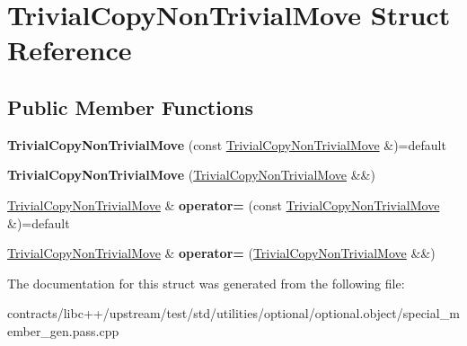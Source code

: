 \hypertarget{struct_trivial_copy_non_trivial_move}{}\section{Trivial\+Copy\+Non\+Trivial\+Move Struct Reference}
\label{struct_trivial_copy_non_trivial_move}
\subsection*{Public Member Functions}
\begin{DoxyCompactItemize}
\item 
\mbox{\label{struct_trivial_copy_non_trivial_move_a9db16c03ff7e561976174f022e8b96e0}} 
{\bfseries Trivial\+Copy\+Non\+Trivial\+Move} (const \mbox{\hyperlink{struct_trivial_copy_non_trivial_move}{Trivial\+Copy\+Non\+Trivial\+Move}} \&)=default
\item 
\mbox{\label{struct_trivial_copy_non_trivial_move_a5a4061f7f4d8db950cba2d0ec3b11548}} 
{\bfseries Trivial\+Copy\+Non\+Trivial\+Move} (\mbox{\hyperlink{struct_trivial_copy_non_trivial_move}{Trivial\+Copy\+Non\+Trivial\+Move}} \&\&)
\item 
\mbox{\label{struct_trivial_copy_non_trivial_move_a4f0f6c2f1333d71b950bfa76efe0ac65}} 
\mbox{\hyperlink{struct_trivial_copy_non_trivial_move}{Trivial\+Copy\+Non\+Trivial\+Move}} \& {\bfseries operator=} (const \mbox{\hyperlink{struct_trivial_copy_non_trivial_move}{Trivial\+Copy\+Non\+Trivial\+Move}} \&)=default
\item 
\mbox{\label{struct_trivial_copy_non_trivial_move_ac725555c741ce71f9dfcb902a35b0f0f}} 
\mbox{\hyperlink{struct_trivial_copy_non_trivial_move}{Trivial\+Copy\+Non\+Trivial\+Move}} \& {\bfseries operator=} (\mbox{\hyperlink{struct_trivial_copy_non_trivial_move}{Trivial\+Copy\+Non\+Trivial\+Move}} \&\&)
\end{DoxyCompactItemize}


The documentation for this struct was generated from the following file\+:\begin{DoxyCompactItemize}
\item 
contracts/libc++/upstream/test/std/utilities/optional/optional.\+object/special\+\_\+member\+\_\+gen.\+pass.\+cpp\end{DoxyCompactItemize}
